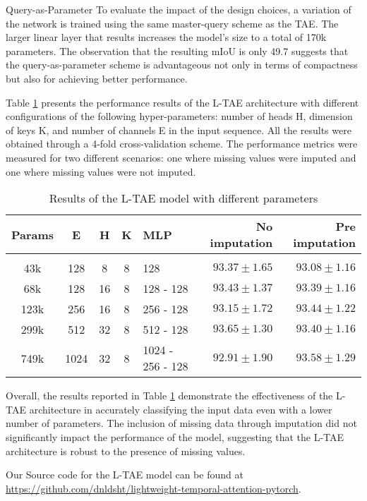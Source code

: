 \begin{paragraph} {Query-as-Parameter}
To evaluate the impact of the design choices, a variation of the network is trained using the same master-query scheme as the TAE.
The larger linear layer that results increases the model's size to a total of 170k parameters.
The observation that the resulting mIoU is only 49.7 suggests that the query-as-parameter scheme is advantageous not only in terms of compactness but also for achieving better performance.
\end{paragraph}

Table \ref{tab:LTAEresults} presents the performance results of the L-TAE architecture with different configurations of the following hyper-parameters: number of heads H, dimension of keys K, and number of channels E in the input sequence.
All the results were obtained through a 4-fold cross-validation scheme.
The performance metrics were measured for two different scenarios: one where missing values were imputed and one where missing values were not imputed.

\begin{table}[ht]
  \centering
  \begin{tabular}{cccclrr} 
     Params & E & H & K & MLP & No imputation & Pre imputation\\[0.2cm] 
     \hline \\[-0.2cm] 
     43k & 	128 & 	8 & 	8 & 	128 & 	$93.37 \pm 1.65$ & 	$93.08 \pm 1.16$\\ 
     68k & 	128 & 	16 & 	8 & 	128 - 128 & 	$93.43 \pm 1.37$ & 	$93.39 \pm 1.16$\\ 
     123k & 	256 & 	16 & 	8 & 	256 - 128 & 	$93.15 \pm 1.72$ & 	$93.44 \pm 1.22$\\ 
     299k & 	512 & 	32 & 	8 & 	512 - 128 & 	$\mathbf{93.65 \pm 1.30}$ & 	$93.40 \pm 1.16$\\ 
     749k & 	1024 & 	32 & 	8 & 	1024 - 256 - 128 & 	$92.91 \pm 1.90$ & 	$\mathbf{93.58 \pm 1.29}$\\ 
  \end{tabular}
  \caption{Results of the L-TAE model with different parameters}
  \label{tab:LTAEresults}
\end{table}

Overall, the results reported in Table \ref{tab:LTAEresults} demonstrate the effectiveness of the L-TAE architecture in accurately classifying the input data even with a lower number of parameters. 
The inclusion of missing data through imputation did not significantly impact the performance of the model, suggesting that the L-TAE architecture is robust to the presence of missing values.


Our Source code for the L-TAE model can be found at \url{https://github.com/dnldsht/lightweight-temporal-attention-pytorch}.